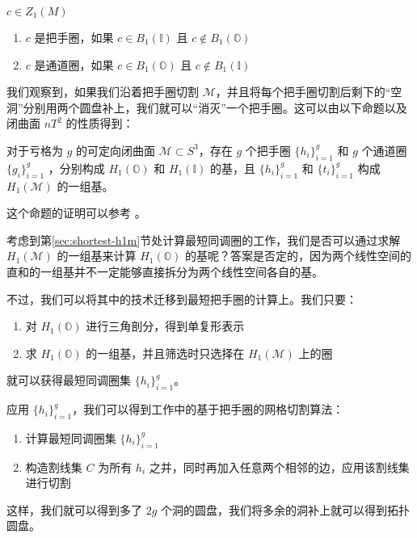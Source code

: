 \begin{definition}
    $ c \in Z_1(M) $
    \begin{enumerate}
        \item $ c $ 是把手圈，如果 $ c \in B_1(\mathbb{I}) $ 且 $ c \notin B_1(\mathbb{O}) $
        \item $ c $ 是通道圈，如果 $ c \in B_1(\mathbb{O}) $ 且 $ c \notin B_1(\mathbb{I}) $
    \end{enumerate}
\end{definition}

我们观察到，如果我们沿着把手圈切割 $ \mathcal{M} $，并且将每个把手圈切割后剩下的“空洞”分别用两个圆盘补上，我们就可以“消灭”一个把手圈。这可以由以下命题以及闭曲面 $ nT^2 $ 的性质得到：

\begin{proposition}
    对于亏格为 $ g $ 的可定向闭曲面 $ \mathcal{M} \subset S^3 $，存在 $ g $ 个把手圈 $ \{h_i\}_{i=1}^{g} $ 和 $ g $ 个通道圈 $ \{g_i\}_{i=1}^{g} $ ，分别构成 $ H_1(\mathbb{O}) $ 和 $ H_1(\mathbb{I}) $ 的基，且 $ \{h_i\}_{i=1}^{g} $ 和 $ \{t_i\}_{i=1}^{g} $ 构成 $ H_1(\mathcal{M}) $ 的一组基。
\end{proposition}

这个命题的证明可以参考 \citet{oncomputinghantun}。

考虑到第\ref{sec:shortest-h1m}节处计算最短同调圈的工作，我们是否可以通过求解 $ H_1(\mathcal{M}) $ 的一组基来计算 $ H_1(\mathbb{O}) $ 的基呢？答案是否定的，因为两个线性空间的直和的一组基并不一定能够直接拆分为两个线性空间各自的基。

不过，我们可以将其中的技术迁移到最短把手圈的计算上。我们只要：
\begin{enumerate}
    \item 对 $ H_1(\mathbb{O}) $ 进行三角剖分，得到单复形表示
    \item 求 $ H_1(\mathbb{O}) $ 的一组基，并且筛选时只选择在 $ H_1(\mathcal{M}) $ 上的圈
\end{enumerate}
就可以获得最短同调圈集 $ \{h_i\}_{i=1}^{g} $。

应用 $ \{h_i\}_{i=1}^{g} $，我们可以得到\citet{ShuangmingChaiThesis}工作中的基于把手圈的网格切割算法：
\begin{enumerate}
    \item 计算最短同调圈集 $ \{h_i\}_{i=1}^{g} $
    \item 构造割线集 $ C $ 为所有 $ h_i $ 之并，同时再加入任意两个相邻的边，应用该割线集进行切割
\end{enumerate}

这样，我们就可以得到多了 $ 2g $ 个洞的圆盘，我们将多余的洞补上就可以得到拓扑圆盘。